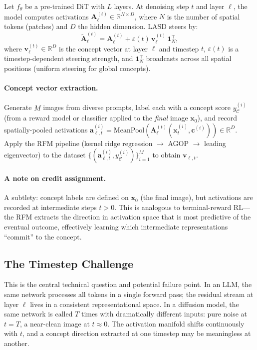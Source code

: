 \documentclass[11pt]{article}
\begin{document}
Let $f_\theta$ be a pre-trained DiT with $L$ layers.
At denoising step $t$ and layer $\ell$, the model computes activations $\mathbf{A}_\ell^{(t)} \in \mathbb{R}^{N \times D}$, where $N$ is the number of spatial tokens (patches) and $D$ the hidden dimension.
LASD steers by:
\begin{equation}
    \tilde{\mathbf{A}}_\ell^{(t)} = \mathbf{A}_\ell^{(t)} + \varepsilon(t)\, \mathbf{v}_\ell^{(t)}\, \mathbf{1}_N^\top,
    \label{eq:lasd}
\end{equation}
where $\mathbf{v}_\ell^{(t)} \in \mathbb{R}^D$ is the concept vector at layer $\ell$ and timestep $t$, $\varepsilon(t)$ is a timestep-dependent steering strength, and $\mathbf{1}_N^\top$ broadcasts across all spatial positions (uniform steering for global concepts).

\paragraph{Concept vector extraction.}
Generate $M$ images from diverse prompts, label each with a concept score $y^{(i)}_\mathcal{C}$ (from a reward model or classifier applied to the \emph{final} image $\mathbf{x}_0$), and record spatially-pooled activations $\mathbf{a}_{\ell,t}^{(i)} = \mathrm{MeanPool}(\mathbf{A}_\ell^{(t)}(\mathbf{x}_t^{(i)}, \mathbf{c}^{(i)})) \in \mathbb{R}^D$.
Apply the RFM pipeline (kernel ridge regression $\to$ AGOP $\to$ leading eigenvector) to the dataset $\{(\mathbf{a}_{\ell,t}^{(i)}, y^{(i)}_\mathcal{C})\}_{i=1}^M$ to obtain $\mathbf{v}_{\ell,t}$.

\paragraph{A note on credit assignment.}
A subtlety: concept labels are defined on $\mathbf{x}_0$ (the final image), but activations are recorded at intermediate steps $t > 0$.
This is analogous to terminal-reward RL---the RFM extracts the direction in activation space that is most predictive of the eventual outcome, effectively learning which intermediate representations ``commit'' to the concept.

\subsection{The Timestep Challenge}
\label{sec:timestep}

This is the central technical question and potential failure point.
In an LLM, the same network processes all tokens in a single forward pass; the residual stream at layer $\ell$ lives in a consistent representational space.
In a diffusion model, the same network is called $T$ times with dramatically different inputs: pure noise at $t = T$, a near-clean image at $t \approx 0$.
The activation manifold shifts continuously with $t$, and a concept direction extracted at one timestep may be meaningless at another.
\end{document}
